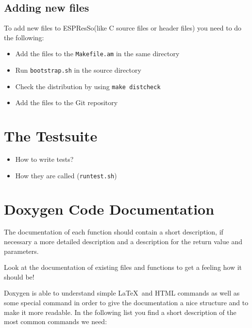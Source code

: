 \documentclass[
a4paper,                        %
11pt,                           %
twoside,                        %
footsepline,                    %
headsepline,                    %
headexclude,                    %
footexclude,                    %
pagesize,                       %
bibtotocnumbered,               %
idxtotoc                        %
]{scrartcl}
\newcommand{\es}{\mbox{\textsf{ESPResSo}}\xspace}
\begin{document}
\subsection{Adding new files}

To add new files to \es (like C source files or header files)
you need to do the following:
\begin{itemize}
\item Add the files to the \texttt{Makefile.am} in the same directory
\item Run \texttt{bootstrap.sh} in the source directory
\item Check the distribution by using \verb!make distcheck!
\item Add the files to the Git repository
\end{itemize}

\section{The Testsuite}
\label{sec:testsuite}

\begin{itemize}
\item How to write tests?
\item How they are called (\texttt{runtest.sh})
\end{itemize}

\section{Doxygen Code Documentation}
\label{sec:doxygen}

The documentation of each function should contain a short description,
if necessary a more detailed description and a description for the
return value and parameters.

Look at the documentation of existing files and functions to get a
feeling how it should be!

Doxygen is able to understand simple \LaTeX\ and HTML commands as well
as some special command in order to give the documentation a nice
structure and to make it more readable. In the following list you find
a short description of the most common commands we need:
\end{document}
